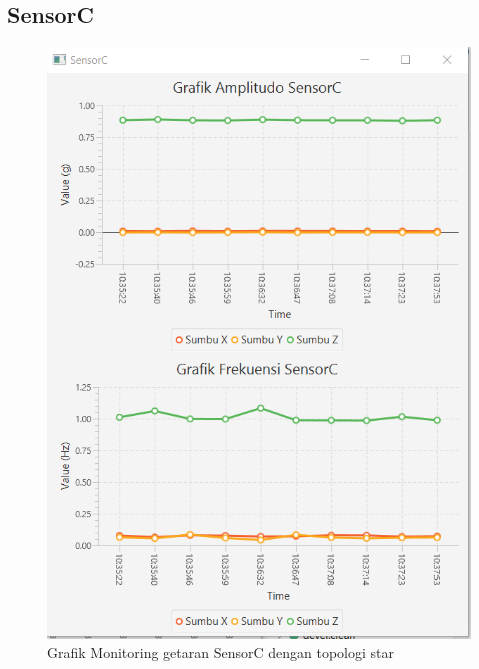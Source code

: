 \subsection{SensorC}
\begin{figure}[H] 
	\centering  
	\includegraphics[scale=1]{Lampiran/HasilPengujian/sensorC_starRooftop2.PNG} 
	\caption[Grafik Monitoring getaran SensorC dengan topologi star]{Grafik Monitoring getaran SensorC dengan topologi star}
	\label{fig:grafik_C_star_rooftop} 
\end{figure}

